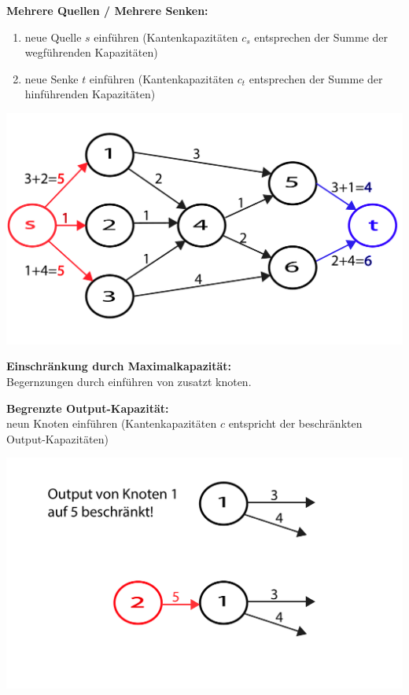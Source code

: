 \begin{minipage}{0.6\textwidth}
\textbf{Mehrere Quellen / Mehrere Senken:}\\
	\begin{enumerate}
		\itemsep-1mm
		\item neue Quelle $s$ einführen (Kantenkapazitäten $c_s$ entsprechen der Summe der wegführenden Kapazitäten)
		\item neue Senke $t$ einführen (Kantenkapazitäten $c_t$ entsprechen der Summe der hinführenden Kapazitäten)
	\end{enumerate}
\end{minipage}
\begin{minipage}{0.4\textwidth}
	\includegraphics[width=\textwidth]{Content/Graphen/MultiSrcSink.pdf}
\end{minipage}

\textbf{Einschränkung durch Maximalkapazität:}\\
Begernzungen durch einführen von zusatzt knoten.

\begin{minipage}{0.6\textwidth}
	\textbf{Begrenzte Output-Kapazität:}\\
	
	neun Knoten einführen (Kantenkapazitäten $c$ entspricht der beschränkten Output-Kapazitäten)
\end{minipage}
\begin{minipage}{0.4\textwidth}
	\includegraphics[width=\textwidth]{Content/Graphen/Constrain.pdf}
\end{minipage}

